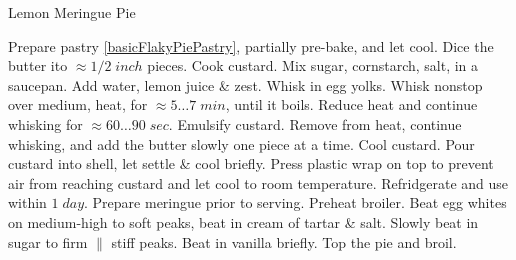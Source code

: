 \begin{recipe}[
preparationtime = 1 hour,
source = \citefield{pie2004}{title} \cite{pie2004},
]
{Lemon Meringue Pie}



\preparation
{
\step Prepare pastry \ref{basicFlakyPiePastry}, partially pre-bake, and let cool. Dice the butter ito $\approx1/2\; inch$ pieces. %
\step Cook custard. Mix sugar, cornstarch, salt, in a saucepan. Add water, lemon juice \& zest. Whisk in egg yolks. Whisk nonstop over medium, heat, for $\approx 5\dots7\; min$, until it boils. Reduce heat and continue whisking for $\approx 60 \dots 90\; sec$.
\step Emulsify custard. Remove from heat, continue whisking, and add the butter slowly one piece at a time.
\step Cool custard. Pour custard into shell, let settle \& cool briefly. Press plastic wrap on top to prevent air from reaching custard and let cool to room temperature. Refridgerate and use within $1\; day$.
\step Prepare meringue prior to serving. Preheat broiler. Beat egg whites on medium-high to soft peaks, beat in cream of tartar \& salt. Slowly beat in sugar to firm $\|$ stiff peaks. Beat in vanilla briefly. Top the pie and broil.

}


\end{recipe}
